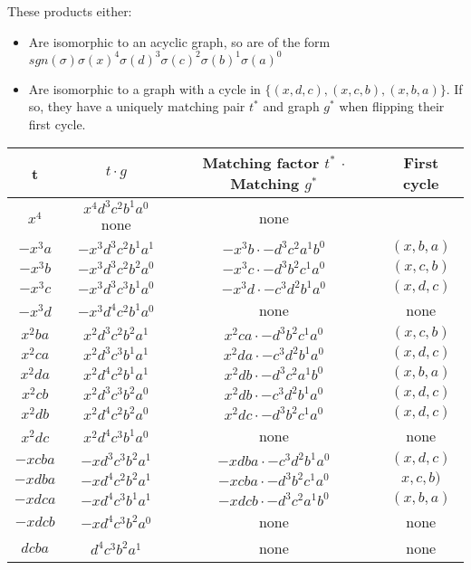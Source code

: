 \documentclass[11pt, oneside]{article} 	%
\begin{document}
These products either:
\begin{itemize}
\item Are isomorphic to an acyclic graph, so are of the form $sgn(\sigma)  \sigma(x)^{4} \sigma(d)^{3} \sigma(c)^{2} \sigma(b)^{1} \sigma(a)^0$
\item Are isomorphic to a graph with a cycle in $\{(x, d, c), (x,c,b), (x,b,a)\}$.  If so, they have a uniquely matching pair $t^*$ and graph $g^*$ when flipping their first cycle.
\end{itemize}



\begin{center}
\begin{tabular}{||c c c c||} 
 \hline
t & $t \cdot g$ & Matching factor $t^*$ $\cdot$ Matching $g^*$ & First cycle \\ [0.5ex] 
 \hline\hline
 $x^4$ & $x^4d^3c^2b^1a^0$ none & none \\ 
 \hline
 $-x^3a$ & $-x^3d^3c^2b^1a^1$ & $-x^3b \cdot -d^3c^2a^1b^0$ & $(x,b,a)$ \\ 
 \hline
 $-x^3b$ & $-x^3d^3c^2b^2a^0$ & $-x^3c \cdot -d^3b^2c^1a^0$ & $(x,c,b)$ \\ 
 \hline
 $-x^3c$ & $-x^3d^3c^3b^1a^0$ & $-x^3d \cdot -c^3d^2b^1a^0$ & $(x,d,c)$ \\ 
 \hline
 $-x^3d$ & $-x^3d^4c^2b^1a^0$ & none & none \\ 
 \hline
 $x^2ba$ & $x^2d^3c^2b^2a^1$ & $x^2ca \cdot -d^3b^2c^1a^0$ &  $(x,c,b)$ \\ 
  \hline
 $x^2ca$ & $x^2d^3c^3b^1a^1$ & $x^2da  \cdot -c^3d^2b^1a^0$ &  $(x,d,c)$ \\ 
 \hline
 $x^2da$ & $x^2d^4c^2b^1a^1$ & $x^2db  \cdot -d^3c^2a^1b^0$ &  $(x,b,a)$ \\ 

 \hline
 $x^2cb$ & $x^2d^3c^3b^2a^0$ & $x^2db  \cdot -c^3d^2b^1a^0$ &  $(x,d,c)$ \\ 
 \hline
 $x^2db$ & $x^2d^4c^2b^2a^0$ & $x^2dc  \cdot -d^3b^2c^1a^0$ &  $(x,d,c)$ \\ 
 
 
\hline
 $x^2dc$ & $x^2d^4c^3b^1a^0$ & none &   none \\ 
 
 \hline
 $-xcba$ & $-xd^3c^3b^2a^1$ & $-xdba  \cdot -c^3d^2b^1a^0$ &  $(x,d,c)$ \\ 

 \hline
 $-xdba$ & $-xd^4c^2b^2a^1$ & $-xcba  \cdot -d^3b^2c^1a^0$ &  $x,c,b)$ \\ 

 \hline
 $-xdca$ & $-xd^4c^3b^1a^1$ & $-xdcb  \cdot -d^3c^2a^1b^0$ &  $(x,b,a)$ \\ 

 \hline
 $-xdcb$ & $-xd^4c^3b^2a^0$ & none &  none \\ 
 
 
 \hline
 $dcba$ & $ d^4c^3b^2a^1 $ & none &  none \\ 
 
 \hline
\end{tabular}
\end{center}
\end{document}
